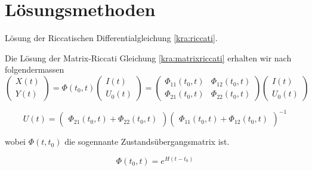 \section{Lösungsmethoden} \label{kra:section:loesung}
Lösung der Riccatischen Differentialgleichung \ref{kra:riccati}.


Die Lösung der Matrix-Riccati Gleichung \ref{kra:matrixriccati} erhalten wir nach \cite{kra:kalmanisae} folgendermassen
\begin{equation}
    \label{kra:matrixriccati-solution}
    \begin{pmatrix}
        X(t) \\
        Y(t)
    \end{pmatrix}
    =
    \Phi(t_0, t)
    \begin{pmatrix}
        I(t) \\
        U_0(t)
    \end{pmatrix}
    =
    \begin{pmatrix}
        \Phi_{11}(t_0, t) & \Phi_{12}(t_0, t) \\
        \Phi_{21}(t_0, t) & \Phi_{22}(t_0, t)
    \end{pmatrix}
    \begin{pmatrix}
        I(t) \\
        U_0(t)
    \end{pmatrix}
\end{equation}

\begin{equation}
    U(t) =
    \begin{pmatrix}
        \Phi_{21}(t_0, t) + \Phi_{22}(t_0, t)
    \end{pmatrix}
    \begin{pmatrix}
        \Phi_{11}(t_0, t) + \Phi_{12}(t_0, t)
    \end{pmatrix}
    ^{-1}
\end{equation}

wobei $\Phi(t, t_0)$ die sogennante Zustandsübergangsmatrix ist.

\begin{equation}
    \Phi(t_0, t) = e^{H(t - t_0)}
\end{equation}
